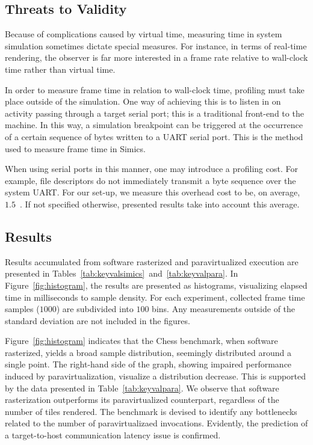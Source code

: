 \subsection{Threats to Validity}
\label{sec:threatstovalidity}
Because of complications caused by virtual time, measuring time in system simulation sometimes dictate special measures.
For instance, in terms of real-time rendering, the observer is far more interested in a frame rate relative to wall-clock time rather than virtual time.

In order to measure frame time in relation to wall-clock time, profiling must take place outside of the simulation.
One way of achieving this is to listen in on activity passing through a target serial port; this is a traditional front-end to the machine.
In this way, a simulation breakpoint can be triggered at the occurrence of a certain sequence of bytes written to a UART serial port.
This is the method used to measure frame time in Simics.

When using serial ports in this manner, one may introduce a profiling cost.
For example, file descriptors do not immediately transmit a byte sequence over the system UART.
For our set-up, we measure this overhead cost to be, on average, $1.5$~\milli\second .
If not specified otherwise, presented results take into account this average.

\subsection{Results}
\label{sec:results}
Results accumulated from software rasterized and paravirtualized execution are presented in Tables~\ref{tab:keyvalsimics}~and~\ref{tab:keyvalpara}.
In Figure~\ref{fig:histogram}, the results are presented as histograms, visualizing elapsed time in milliseconds to sample density.
For each experiment, collected frame time samples ($1000$) are subdivided into $100$ bins.
Any measurements outside of the standard deviation are not included in the figures.

Figure~\ref{fig:histogram} indicates that the Chess benchmark, when software rasterized, yields a broad sample distribution, seemingly distributed around a single point.
The right-hand side of the graph, showing impaired performance induced by paravirtualization, visualize a distribution decrease.
This is supported by the data presented in Table~\ref{tab:keyvalpara}.
We observe that software rasterization outperforms its paravirtualized counterpart, regardless of the number of tiles rendered.
The benchmark is devised to identify any bottlenecks related to the number of paravirtualizaed invocations.
Evidently, the prediction of a target-to-host communication latency issue is confirmed.

